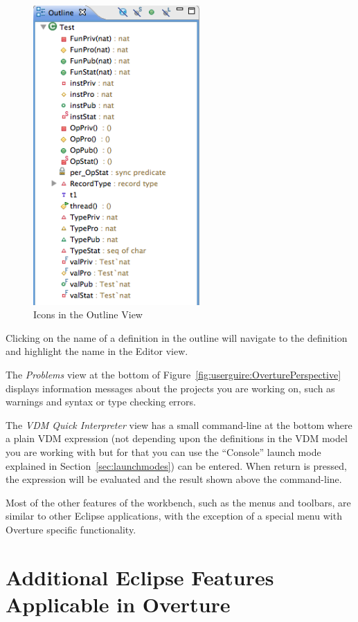 \documentclass{overturerepchap}
\begin{document}
\begin{figure}[!htb]
\begin{center}
  \includegraphics[width=2.5in]{figures/OutlineIcons}
  \caption[labelInTOC]{Icons in the Outline View}
  \label{fig:OutlineIcons}
\end{center}
\end{figure}

Clicking on the name of a definition in the outline will navigate to
the definition and highlight the name in the Editor view.

The \emph{Problems} view at the bottom of 
Figure~\ref{fig:userguire:OverturePerspective} displays 
information messages about the projects you are
working on, such as warnings and syntax or type checking errors.

The \emph{VDM Quick Interpreter}
view has a small command-line at the bottom where a plain VDM expression
(not depending upon the definitions in the VDM model you are working
with but for that you can use the ``Console'' launch mode explained in
Section~\ref{sec:launchmodes}) can be
entered. When return is pressed, the expression will be evaluated and
the result shown above the command-line.

Most of the other features of the workbench, such as the menus and
toolbars, are similar to other Eclipse applications, with the exception 
of a special menu with Overture specific functionality.

\section{Additional Eclipse Features Applicable in Overture}
\end{document}
